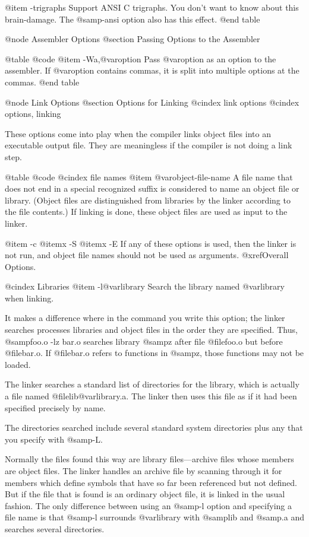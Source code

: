 {{@item -trigraphs
Support ANSI C trigraphs.  You don't want to know about this
brain-damage.  The @samp{-ansi} option also has this effect.
@end table

@node Assembler Options
@section Passing Options to the Assembler

@table @code
@item -Wa,@var{option}
Pass @var{option} as an option to the assembler.  If @var{option}
contains commas, it is split into multiple options at the commas.
@end table

@node Link Options
@section Options for Linking
@cindex link options
@cindex options, linking

These options come into play when the compiler links object files into
an executable output file.  They are meaningless if the compiler is
not doing a link step.

@table @code
@cindex file names
@item @var{object-file-name}
A file name that does not end in a special recognized suffix is
considered to name an object file or library.  (Object files are
distinguished from libraries by the linker according to the file
contents.)  If linking is done, these object files are used as input
to the linker.

@item -c
@itemx -S
@itemx -E
If any of these options is used, then the linker is not run, and
object file names should not be used as arguments.  @xref{Overall
Options}.

@cindex Libraries
@item -l@var{library}
Search the library named @var{library} when linking.

It makes a difference where in the command you write this option; the
linker searches processes libraries and object files in the order they
are specified.  Thus, @samp{foo.o -lz bar.o} searches library @samp{z}
after file @file{foo.o} but before @file{bar.o}.  If @file{bar.o} refers
to functions in @samp{z}, those functions may not be loaded.

The linker searches a standard list of directories for the library,
which is actually a file named @file{lib@var{library}.a}.  The linker
then uses this file as if it had been specified precisely by name.

The directories searched include several standard system directories
plus any that you specify with @samp{-L}.

Normally the files found this way are library files---archive files
whose members are object files.  The linker handles an archive file by
scanning through it for members which define symbols that have so far
been referenced but not defined.  But if the file that is found is an
ordinary object file, it is linked in the usual fashion.  The only
difference between using an @samp{-l} option and specifying a file name
is that @samp{-l} surrounds @var{library} with @samp{lib} and @samp{.a}
and searches several directories.

}}
